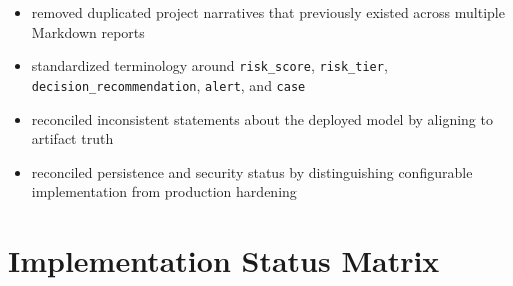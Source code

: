 \documentclass[11pt]{article}
\newcommand{\code}[1]{\texttt{#1}}
\begin{document}
\begin{itemize}
  \item removed duplicated project narratives that previously existed across multiple Markdown reports
  \item standardized terminology around \code{risk\_score}, \code{risk\_tier}, \code{decision\_recommendation}, \code{alert}, and \code{case}
  \item reconciled inconsistent statements about the deployed model by aligning to artifact truth
  \item reconciled persistence and security status by distinguishing configurable implementation from production hardening
\end{itemize}

\section*{Implementation Status Matrix}
\end{document}
